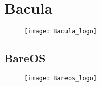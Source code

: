 
\section{Bacula}%
\label{sec:bacula}

\begin{figure}[H]
    \centering
    \texttt{[image: Bacula\_logo]}
\end{figure}

\subsection{BareOS}%
\label{sub:bareos}

\begin{figure}[H]
    \centering
    \texttt{[image: Bareos\_logo]}
\end{figure}
